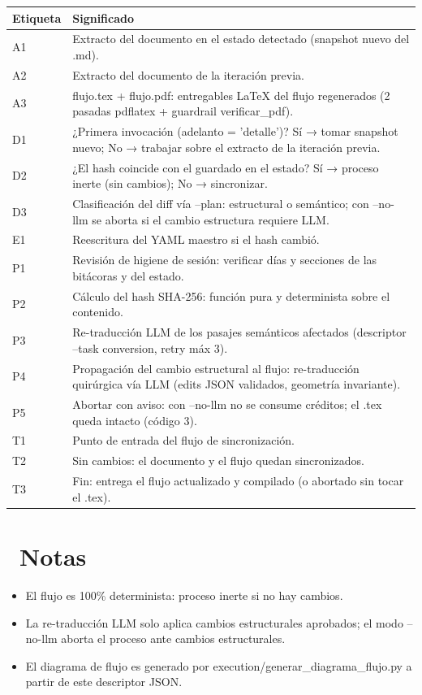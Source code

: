 \documentclass[11pt,a4paper]{article}
\newcommand{\iconotexto}[2]{\textcolor{cyanNeon}{\faIcon{#1}}~#2}
\begin{document}
\vspace{6pt}
\begin{tcolorbox}[cajaContenido, title={\faIcon{table}~Leyenda de etiquetas}]
\small
\begin{tabularx}{\linewidth}{@{}>{\centering\arraybackslash}p{1.4cm}X@{}}
\toprule
\textbf{Etiqueta} & \textbf{Significado} \\ \midrule
A1 & Extracto del documento en el estado detectado (snapshot nuevo del .md). \\
A2 & Extracto del documento de la iteración previa. \\
A3 & flujo.tex + flujo.pdf: entregables LaTeX del flujo regenerados (2 pasadas pdflatex + guardrail verificar\_pdf). \\
D1 & ¿Primera invocación (adelanto = 'detalle')? Sí → tomar snapshot nuevo; No → trabajar sobre el extracto de la iteración previa. \\
D2 & ¿El hash coincide con el guardado en el estado? Sí → proceso inerte (sin cambios); No → sincronizar. \\
D3 & Clasificación del diff vía --plan: estructural o semántico; con --no-llm se aborta si el cambio estructura requiere LLM. \\
E1 & Reescritura del YAML maestro si el hash cambió. \\
P1 & Revisión de higiene de sesión: verificar días y secciones de las bitácoras y del estado. \\
P2 & Cálculo del hash SHA-256: función pura y determinista sobre el contenido. \\
P3 & Re-traducción LLM de los pasajes semánticos afectados (descriptor --task conversion, retry máx 3). \\
P4 & Propagación del cambio estructural al flujo: re-traducción quirúrgica vía LLM (edits JSON validados, geometría invariante). \\
P5 & Abortar con aviso: con --no-llm no se consume créditos; el .tex queda intacto (código 3). \\
T1 & Punto de entrada del flujo de sincronización. \\
T2 & Sin cambios: el documento y el flujo quedan sincronizados. \\
T3 & Fin: entrega el flujo actualizado y compilado (o abortado sin tocar el .tex). \\
\bottomrule
\end{tabularx}
\end{tcolorbox}


\section{\iconotexto{sticky-note}{Notas}}
\begin{itemize}
\item El flujo es 100\% determinista: proceso inerte si no hay cambios.
\item La re-traducción LLM solo aplica cambios estructurales aprobados; el modo --no-llm aborta el proceso ante cambios estructurales.
\item El diagrama de flujo es generado por execution/generar\_diagrama\_flujo.py a partir de este descriptor JSON.
\end{itemize}

\end{document}
